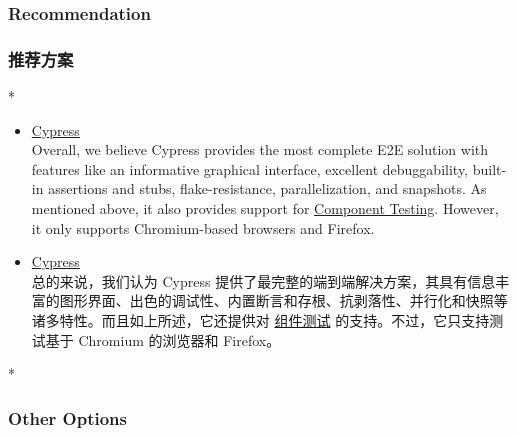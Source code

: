 \begin{paracol}{2}
\subsubsection{Recommendation}
\switchcolumn
\subsubsection{推荐方案}
\switchcolumn[0]*%
\begin{itemize}
\item
  \href{https://www.cypress.io/}{Cypress}\\
  Overall, we believe Cypress provides the most complete E2E solution
  with features like an informative graphical interface, excellent
  debuggability, built-in assertions and stubs, flake-resistance,
  parallelization, and snapshots. As mentioned above, it also provides
  support for
  \href{https://docs.cypress.io/guides/component-testing/introduction}{Component
  Testing}. However, it only supports Chromium-based browsers and
  Firefox.
\end{itemize}
\switchcolumn
\begin{itemize}
\item
  \href{https://www.cypress.io/}{Cypress}\\
  总的来说，我们认为 Cypress
  提供了最完整的端到端解决方案，其具有信息丰富的图形界面、出色的调试性、内置断言和存根、抗剥落性、并行化和快照等诸多特性。而且如上所述，它还提供对
  \href{https://docs.cypress.io/guides/component-testing/introduction}{组件测试}
  的支持。不过，它只支持测试基于 Chromium 的浏览器和 Firefox。
\end{itemize}
\switchcolumn[0]*%
\subsubsection{Other Options}
\switchcolumn

\end{paracol}
